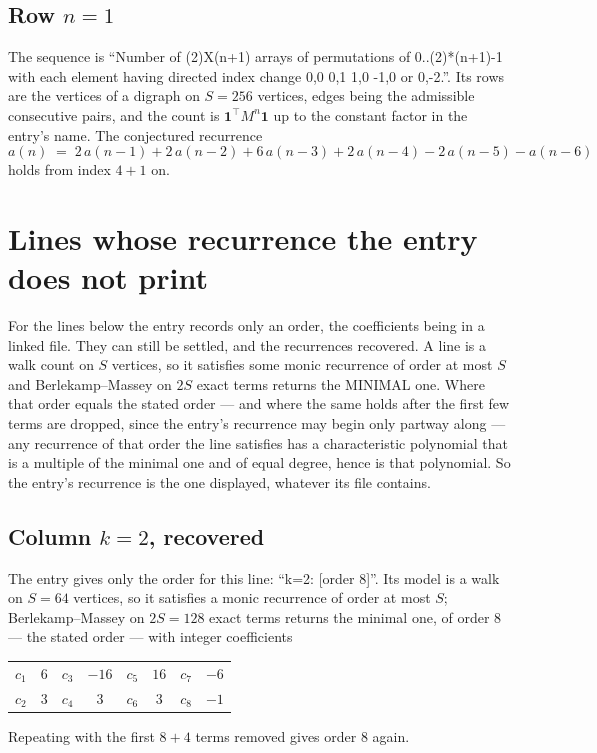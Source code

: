 \documentclass[11pt,a4paper]{article}
\theoremstyle{plain}
\theoremstyle{definition}
\begin{document}
\subsection*{Row $n$$=1$}
The sequence is ``Number of (2)X(n+1) arrays of permutations of 0..(2)*(n+1)-1 with each element having directed index change 0,0 0,1 1,0 -1,0 or 0,-2.''. Its rows are the vertices of a digraph on
$S=256$ vertices, edges being the admissible consecutive pairs, and the count is
$\mathbf{1}^{\!\top}M^{n}\mathbf{1}$ up to the constant factor in the entry's name.
The conjectured recurrence
\[
a(n)\;=\;2\,a(n-1) + 2\,a(n-2) + 6\,a(n-3) + 2\,a(n-4) - 2\,a(n-5) - a(n-6)
\]
holds from index $4+1$ on.


\section{Lines whose recurrence the entry does not print}

For the lines below the entry records only an order, the coefficients being in a linked file.
They can still be settled, and the recurrences recovered. A line is a walk count on $S$
vertices, so it satisfies some monic recurrence of order at most $S$ and Berlekamp--Massey on
$2S$ exact terms returns the MINIMAL one. Where that order equals the stated order --- and
where the same holds after the first few terms are dropped, since the entry's recurrence may
begin only partway along --- any recurrence of that order the line satisfies has a
characteristic polynomial that is a multiple of the minimal one and of equal degree, hence is
that polynomial. So the entry's recurrence is the one displayed, whatever its file contains.

\subsection*{Column $k=2$, recovered}
The entry gives only the order for this line: ``k=2: [order 8]''. Its model is a walk on
$S=64$ vertices, so it satisfies a monic recurrence of order at most $S$;
Berlekamp--Massey on $2S=128$ exact terms returns the minimal one, of order
$8$ --- the stated order --- with integer coefficients
\begin{center}\small\begin{tabular}{cccccccc}
$c_{1}$ & $6$ & $c_{3}$ & $-16$ & $c_{5}$ & $16$ & $c_{7}$ & $-6$ \\
$c_{2}$ & $3$ & $c_{4}$ & $3$ & $c_{6}$ & $3$ & $c_{8}$ & $-1$ \\
\end{tabular}\end{center}
Repeating with the first $8+4$ terms removed gives order $8$ again.
\end{document}
